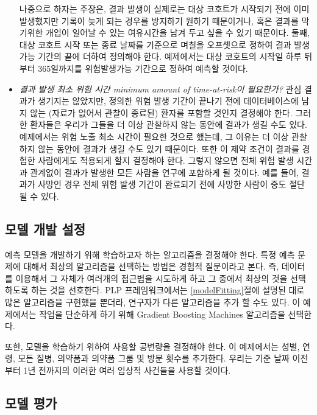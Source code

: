 \documentclass[10.5pt]{book}
\theoremstyle{definition}
\theoremstyle{definition}
\theoremstyle{definition}
\theoremstyle{remark}
\begin{document}
\begin{itemize}
  나중으로 하자는 주장은, 결과 발생이 실제로는 대상 코호트가 시작되기
  전에 이미 발생했지만 기록이 늦게 되는 경우를 방지하기 원하기
  때문이거나, 혹은 결과를 막기위한 개입이 일어날 수 있는 여유시간을 남겨
  두고 싶을 수 있기 때문이다. 둘째, 대상 코호트 시작 또는 종료 날짜를
  기준으로 며칠을 오프셋으로 정하여 결과 발생 가능 기간의 끝에 더하여
  정의해야 한다. 예제에서는 대상 코호트의 시작일 하루 뒤부터 365일까지를
  위험발생가능 기간으로 정하여 예측할 것이다.
\item
  \emph{결과 발생 최소 위험 시간 minimum amount of time-at-risk이
  필요한가?} 관심 결과가 생기지는 않았지만, 정의한 위험 발생 기간이
  끝나기 전에 데이터베이스에 남지 않는 (자료가 없어서 관찰이 종료된)
  환자를 포함할 것인지 결정해야 한다. 그러한 환자들은 우리가 그들을 더
  이상 관찰하지 않는 동안에 결과가 생길 수도 있다. 예제에서는 위험 노출
  최소 시간이 필요한 것으로 했는데, 그 이유는 더 이상 관찰하지 않는
  동안에 결과가 생길 수도 있기 때문이다. 또한 이 제약 조건이 결과를
  경험한 사람에게도 적용되게 할지 결정해야 한다. 그렇지 않으면 전체 위험
  발생 시간과 관계없이 결과가 발생한 모든 사람을 연구에 포함하게 될
  것이다. 예를 들어, 결과가 사망인 경우 전체 위험 발생 기간이 완료되기
  전에 사망한 사람이 중도 절단될 수 있다.
\end{itemize}

\subsection{모델 개발 설정}\label{--}

예측 모델을 개발하기 위해 학습하고자 하는 알고리즘을 결정해야 한다. 특정
예측 문제에 대해서 최상의 알고리즘을 선택하는 방법은 경험적 질문이라고
본다. 즉, 데이터를 이용해서 그 자체가 여러개의 접근법을 시도하게 하고 그
중에서 최상의 것을 선택하도록 하는 것을 선호한다. PLP 프레임워크에서는
\ref{modelFitting}절에 설명된 대로 많은 알고리즘을 구현했을 뿐더라,
연구자가 다른 알고리즘을 추가 할 수도 있다. 이 예제에서는 작업을
단순하게 하기 위해 Gradient Boosting Machines 알고리즘을 선택한다.

또한, 모델을 학습하기 위하여 사용할 공변량을 결정해야 한다. 이
예제에서는 성별, 연령, 모든 질병, 의약품과 의약품 그룹 및 방문 횟수를
추가한다. 우리는 기준 날짜 이전부터 1년 전까지의 이러한 여러 임상적
사건들을 사용할 것이다.

\subsection{모델 평가}\label{-}
\end{document}
